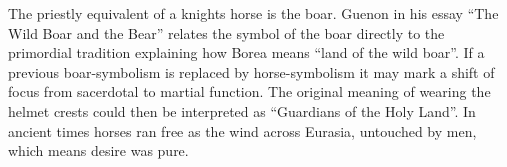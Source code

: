 \begin{footnotesize}
\begin{sffamily}
The priestly equivalent of a knights horse is the boar. Guenon in his essay ``The Wild Boar and the Bear'' relates the symbol of the boar directly to the primordial tradition explaining how Borea means ``land of the wild boar''. If a previous boar-symbolism is replaced by horse-symbolism it may mark a shift of focus from sacerdotal to martial function. The original meaning of wearing the helmet crests could then be interpreted as ``Guardians of the Holy Land''. In ancient times horses ran free as the wind across Eurasia, untouched by men, which means desire was pure.

\end{sffamily}
\end{footnotesize}


